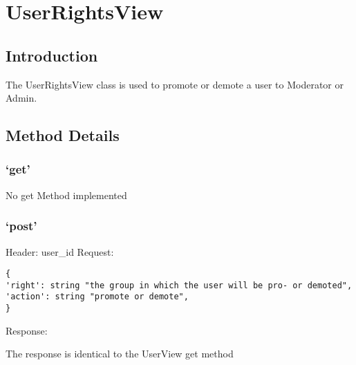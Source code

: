 \chapter*{UserRightsView}

\section*{Introduction}\label{introduction}

The UserRightsView class is used to promote or demote a user to
Moderator or Admin.

\section*{Method Details}\label{method-details}

\subsection*{\texorpdfstring{`get'}{get}}\label{get}

No get Method implemented

\subsection*{\texorpdfstring{`post'}{post}}\label{post}

Header: user\_id Request:

\begin{verbatim}
{
'right': string "the group in which the user will be pro- or demoted",
'action': string "promote or demote",
}
\end{verbatim}

Response:

The response is identical to the UserView get method

